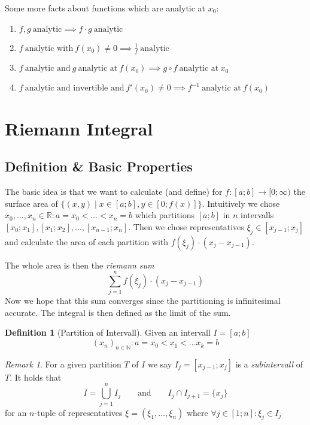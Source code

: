 \documentclass[english,titlepage]{uzhpub}
\theoremstyle{definition}
\newtheorem{definition}{Definition}[section]
\theoremstyle{plain}
\theoremstyle{remark}
\newtheorem*{remark}{Remark}
\theoremstyle{example}
\begin{document}
   Some more facts about functions which are analytic at \(x_0\):
   \begin{enumerate}
      \item \(f, g~\text{analytic} \implies f \cdot g~\text{analytic}\)
      \item \(f~\text{analytic with}~f(x_0) \neq 0 \implies \frac{1}{f}~\text{analytic}\)
      \item \(f~\text{analytic and}~g~\text{analytic at}~f(x_0) \implies g \circ f~\text{analytic at}~x_0\)
      \item \(f~\text{analytic and invertible and}~f'(x_0) \neq 0 \implies f^{-1}~\text{analytic at}~f(x_0)\)
   \end{enumerate}

   \section{Riemann Integral}
   \subsection{Definition \& Basic Properties}
   The basic idea is that we want to calculate (and define) for \(f: [a; b] \to [0; \infty)\) the surface area of \(\{(x, y) \mid x \in [a; b], y \in [0; f(x)]\}\).
   Intuitively we chose \(x_0, \ldots, x_n \in \mathbb{R}: a = x_0 < \ldots < x_n = b\) which partitions \([a; b]\) in \(n\) intervalls \([x_0; x_1], [x_1; x_2], \ldots, [x_{n-1}; x_n]\).
   Then we chose representatives \(\xi_j \in [x_{j-1}; x_j]\) and calculate the area of each partition with \(f(\xi_j) \cdot (x_j - x_{j-1})\).

   \begin{center}
      
   \end{center}

   The whole area is then the \textit{riemann sum}
   \[\sum_{j=1}^n f(\xi_j) \cdot (x_j - x_{j-1})\]
   Now we hope that this sum converges since the partitioning is infinitesimal accurate.
   The integral is then defined as the limit of the sum.

   \begin{definition}[Partition of Intervall]
      Given an intervall \(I = [a; b]\)
      \[(x_n)_{n \in \mathbb{N}}: a = x_0 < x_1 < \ldots x_k = b\]
   \end{definition}
   \begin{remark}
      For a given partition \(T\) of \(I\) we say \(I_j = [x_{j-1}; x_j]\) is a \textit{subintervall} of \(T\).
      It holds that
      \[I = \bigcup_{j=1}^n I_j \qquad\text{and}\qquad I_j \cap I_{j+1} = \{x_j\}\]
      for an \(n\)-tuple of representatives \(\xi = (\xi_1, \ldots, \xi_n)\) where \(\forall j \in [1; n]: \xi_j \in I_j\)
   \end{remark}
\end{document}
